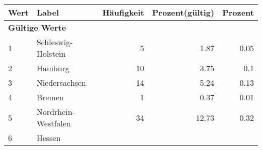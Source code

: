      \begin{longtable}{lXrrr}
     \toprule
     \textbf{Wert} & \textbf{Label} & \textbf{Häufigkeit} & \textbf{Prozent(gültig)} & \textbf{Prozent} \\
     \endhead
     \midrule
     \multicolumn{5}{l}{\textbf{Gültige Werte}}\\

     1 &
     \multicolumn{1}{X}{ Schleswig-Holstein   } &


       \num{5} &
       \num[round-mode=places,round-precision=2]{1.87} &
         \num[round-mode=places,round-precision=2]{0.05} \\

     2 &
     \multicolumn{1}{X}{ Hamburg   } &


       \num{10} &
       \num[round-mode=places,round-precision=2]{3.75} &
         \num[round-mode=places,round-precision=2]{0.1} \\

     3 &
     \multicolumn{1}{X}{ Niedersachsen   } &


       \num{14} &
       \num[round-mode=places,round-precision=2]{5.24} &
         \num[round-mode=places,round-precision=2]{0.13} \\

     4 &
     \multicolumn{1}{X}{ Bremen   } &


       \num{1} &
       \num[round-mode=places,round-precision=2]{0.37} &
         \num[round-mode=places,round-precision=2]{0.01} \\

     5 &
     \multicolumn{1}{X}{ Nordrhein-Westfalen   } &


       \num{34} &
       \num[round-mode=places,round-precision=2]{12.73} &
         \num[round-mode=places,round-precision=2]{0.32} \\

     6 &
     \multicolumn{1}{X}{ Hessen   } &



\end{longtable}
